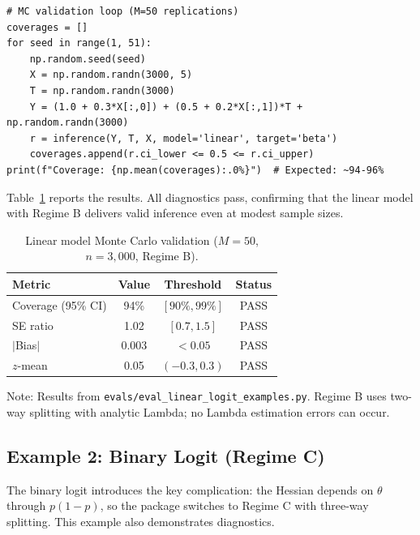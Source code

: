 \begin{lstlisting}
# MC validation loop (M=50 replications)
coverages = []
for seed in range(1, 51):
    np.random.seed(seed)
    X = np.random.randn(3000, 5)
    T = np.random.randn(3000)
    Y = (1.0 + 0.3*X[:,0]) + (0.5 + 0.2*X[:,1])*T + np.random.randn(3000)
    r = inference(Y, T, X, model='linear', target='beta')
    coverages.append(r.ci_lower <= 0.5 <= r.ci_upper)
print(f"Coverage: {np.mean(coverages):.0%}")  # Expected: ~94-96%
\end{lstlisting}

\noindent Table~\ref{tab:linear_mc} reports the results. All diagnostics pass, confirming that the linear model with Regime B delivers valid inference even at modest sample sizes.

\begin{table}[ht]
\centering
\caption{Linear model Monte Carlo validation ($M=50$, $n=3{,}000$, Regime B).}\label{tab:linear_mc}
\begin{tabular}{lccc}
\toprule
\textbf{Metric} & \textbf{Value} & \textbf{Threshold} & \textbf{Status} \\
\midrule
Coverage (95\% CI) & 94\% & $[90\%, 99\%]$ & PASS \\
SE ratio            & 1.02  & $[0.7, 1.5]$   & PASS \\
$|$Bias$|$          & 0.003 & $< 0.05$        & PASS \\
$z$-mean            & 0.05  & $(-0.3, 0.3)$   & PASS \\
\bottomrule
\end{tabular}
\begin{tablenotes}\small
\item Note: Results from \texttt{evals/eval\_linear\_logit\_examples.py}. Regime B uses two-way splitting with analytic Lambda; no Lambda estimation errors can occur.
\end{tablenotes}
\end{table}

\subsection{Example 2: Binary Logit (Regime C)}

The binary logit introduces the key complication: the Hessian depends on $\theta$ through $p(1-p)$, so the package switches to Regime C with three-way splitting. This example also demonstrates diagnostics.

